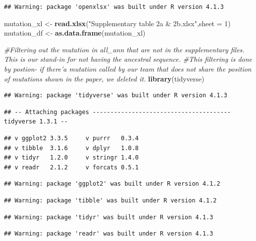 \documentclass[
]{article}
\newenvironment{Shaded}{\begin{snugshade}}{\end{snugshade}}
\newcommand{\CommentTok}[1]{\textcolor[rgb]{0.56,0.35,0.01}{\textit{#1}}}
\newcommand{\DataTypeTok}[1]{\textcolor[rgb]{0.13,0.29,0.53}{#1}}
\newcommand{\DecValTok}[1]{\textcolor[rgb]{0.00,0.00,0.81}{#1}}
\newcommand{\KeywordTok}[1]{\textcolor[rgb]{0.13,0.29,0.53}{\textbf{#1}}}
\newcommand{\NormalTok}[1]{#1}
\newcommand{\StringTok}[1]{\textcolor[rgb]{0.31,0.60,0.02}{#1}}
\begin{document}
\begin{verbatim}
## Warning: package 'openxlsx' was built under R version 4.1.3
\end{verbatim}

\begin{Shaded}
\begin{Highlighting}[]
\NormalTok{mutation_xl <-}\StringTok{ }\KeywordTok{read.xlsx}\NormalTok{(}\StringTok{"Supplementary table 2a & 2b.xlsx"}\NormalTok{,}\DataTypeTok{sheet =} \DecValTok{1}\NormalTok{)}
\NormalTok{mutation_df <-}\StringTok{ }\KeywordTok{as.data.frame}\NormalTok{(mutation_xl)}

\CommentTok{#Filtering out the mutation in all_ann that are not in the supplementary files. This is our stand-in for not having the ancestral sequence. }
\CommentTok{#This filtering is done by postion- if there'a mutation called by our team that does not share the position of mutations shown in the paper, we deleted it. }
\KeywordTok{library}\NormalTok{(tidyverse)}
\end{Highlighting}
\end{Shaded}

\begin{verbatim}
## Warning: package 'tidyverse' was built under R version 4.1.3
\end{verbatim}

\begin{verbatim}
## -- Attaching packages --------------------------------------- tidyverse 1.3.1 --
\end{verbatim}

\begin{verbatim}
## v ggplot2 3.3.5     v purrr   0.3.4
## v tibble  3.1.6     v dplyr   1.0.8
## v tidyr   1.2.0     v stringr 1.4.0
## v readr   2.1.2     v forcats 0.5.1
\end{verbatim}

\begin{verbatim}
## Warning: package 'ggplot2' was built under R version 4.1.2
\end{verbatim}

\begin{verbatim}
## Warning: package 'tibble' was built under R version 4.1.2
\end{verbatim}

\begin{verbatim}
## Warning: package 'tidyr' was built under R version 4.1.3
\end{verbatim}

\begin{verbatim}
## Warning: package 'readr' was built under R version 4.1.3
\end{verbatim}
\end{document}
